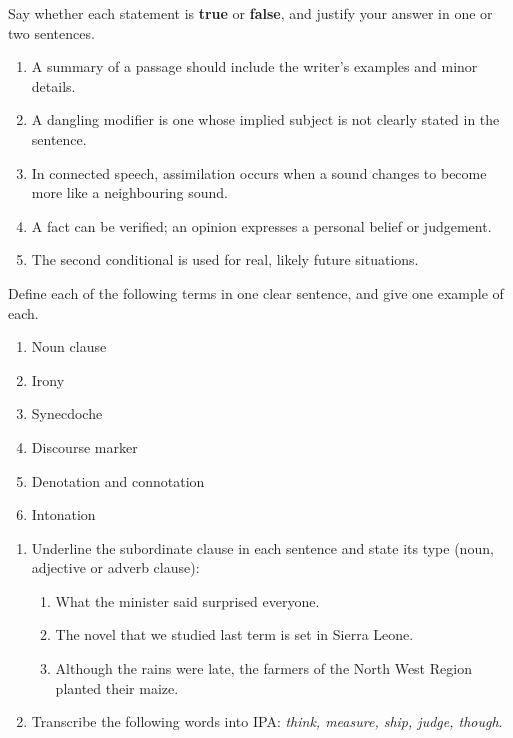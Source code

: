 \documentclass[11pt]{article}
\begin{document}
\begin{exercice}
Say whether each statement is \textbf{true} or \textbf{false}, and justify your answer in one or two sentences.
\begin{enumerate}
\item A summary of a passage should include the writer's examples and minor details.
\item A dangling modifier is one whose implied subject is not clearly stated in the sentence.
\item In connected speech, assimilation occurs when a sound changes to become more like a neighbouring sound.
\item A fact can be verified; an opinion expresses a personal belief or judgement.
\item The second conditional is used for real, likely future situations.
\end{enumerate}
\end{exercice}

\begin{exercice}[Definitions]
Define each of the following terms in one clear sentence, and give one example of each.
\begin{enumerate}
\item Noun clause
\item Irony
\item Synecdoche
\item Discourse marker
\item Denotation and connotation
\item Intonation
\end{enumerate}
\end{exercice}

\begin{exercice}
\begin{enumerate}
\item Underline the subordinate clause in each sentence and state its type (noun, adjective or adverb clause):
\begin{enumerate}
\item What the minister said surprised everyone.
\item The novel that we studied last term is set in Sierra Leone.
\item Although the rains were late, the farmers of the North West Region planted their maize.
\end{enumerate}
\item Transcribe the following words into IPA: \emph{think, measure, ship, judge, though}.
\end{enumerate}
\end{exercice}
\end{document}
